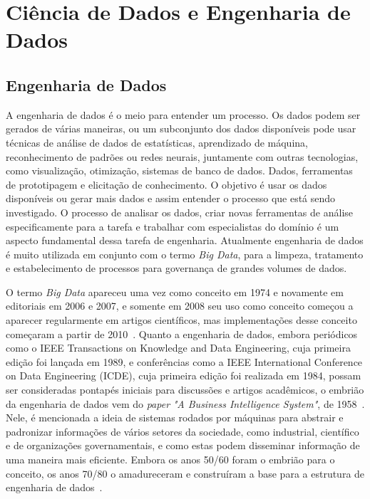 \documentclass[portugues]{ic-tese}
\begin{document}
\section{Ciência de Dados e Engenharia de Dados}
\label{sec:CienciaEngDados}

\subsection{Engenharia de Dados}

A engenharia de dados é o meio para entender um processo. Os dados podem ser gerados de várias maneiras, ou um subconjunto dos dados disponíveis pode usar técnicas de análise de dados de estatísticas, aprendizado de máquina, reconhecimento de padrões ou redes neurais, juntamente com outras tecnologias, como visualização, otimização, sistemas de banco de dados. Dados, ferramentas de prototipagem e elicitação de conhecimento. O objetivo é usar os dados disponíveis ou gerar mais dados e assim entender o processo que está sendo investigado. O processo de analisar os dados, criar novas ferramentas de análise especificamente para a tarefa e trabalhar com especialistas do domínio é um aspecto fundamental dessa tarefa de engenharia. Atualmente engenharia de dados é muito utilizada em conjunto com o termo \textit{Big Data}, para a limpeza, tratamento e estabelecimento de processos para governança de grandes volumes de dados.

O termo \textit{Big Data} apareceu uma vez como conceito em 1974 e novamente em editoriais em 2006 e 2007, e somente em 2008 seu uso como conceito começou a aparecer regularmente em artigos científicos, mas implementações desse conceito começaram a partir de 2010~\citep{Raban_2020}. Quanto a engenharia de dados, embora periódicos como o IEEE Transactions on Knowledge and Data Engineering, cuja primeira edição foi lançada em 1989, e conferências como a IEEE International Conference on Data Engineering (ICDE), cuja primeira edição foi realizada em 1984, possam ser consideradas pontapés iniciais para discussões e artigos acadêmicos, o embrião da engenharia de dados vem do \textit{paper} \textit{"A Business Intelligence System"}, de 1958~\citep{Panoply_2017}. Nele, é mencionada a ideia de sistemas rodados por máquinas para abstrair e padronizar informações de vários setores da sociedade, como industrial, científico e de organizações governamentais, e como estas podem disseminar informação de uma maneira mais eficiente. Embora os anos 50/60 foram o embrião para o conceito, os anos 70/80 o amadureceram e construíram a base para a estrutura de engenharia de dados~\citep{Panoply_2017}.
\end{document}
